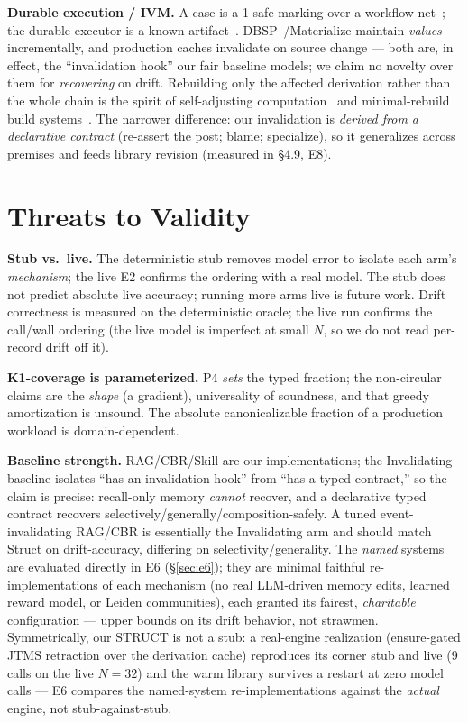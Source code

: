 \documentclass[11pt]{article}
\newcommand{\K}{\textsf{K1}}
\begin{document}
\textbf{Durable execution / IVM.} A case is a 1-safe marking over a workflow net~\cite{vanderaalst1998}; the durable
executor is a known artifact~\cite{aws2022,dbos2022}. DBSP~\cite{budiu2023}/Materialize maintain \emph{values}
incrementally, and production caches invalidate on source change --- both are, in effect, the ``invalidation hook''
our fair baseline models; we claim no novelty over them for \emph{recovering} on drift. Rebuilding only the affected
derivation rather than the whole chain is the spirit of self-adjusting computation~\cite{acar2002} and
minimal-rebuild build systems~\cite{mokhov2018}. The narrower difference: our
invalidation is \emph{derived from a declarative contract} (re-assert the post; blame; specialize), so it generalizes
across premises and feeds library revision (measured in \S4.9, E8).

\section{Threats to Validity}
\textbf{Stub vs.\ live.} The deterministic stub removes model error to isolate each arm's \emph{mechanism}; the live
E2 confirms the ordering with a real model. The stub does not predict absolute live accuracy; running more arms live
is future work. Drift correctness is measured on the deterministic oracle; the live run confirms the call/wall
ordering (the live model is imperfect at small $N$, so we do not read per-record drift off it).

\textbf{\K{}-coverage is parameterized.} P4 \emph{sets} the typed fraction; the non-circular claims are the
\emph{shape} (a gradient), universality of soundness, and that greedy amortization is unsound. The absolute
canonicalizable fraction of a production workload is domain-dependent.

\textbf{Baseline strength.} RAG/CBR/Skill are our implementations; the Invalidating baseline isolates ``has an
invalidation hook'' from ``has a typed contract,'' so the claim is precise: recall-only memory \emph{cannot}
recover, and a declarative typed contract recovers selectively/generally/composition-safely. A tuned
event-invalidating RAG/CBR is essentially the Invalidating arm and
should match Struct on drift-accuracy, differing on selectivity/generality. The \emph{named} systems are evaluated
directly in E6 (\S\ref{sec:e6}); they are minimal faithful re-implementations of each mechanism (no real LLM-driven
memory edits, learned reward model, or Leiden communities), each granted its fairest, \emph{charitable}
configuration --- upper bounds on its drift behavior, not strawmen. Symmetrically, our STRUCT is not a stub: a
real-engine realization (ensure-gated JTMS retraction over the derivation cache) reproduces its corner stub and
live (9 calls on the live $N=32$) and the warm library survives a restart at zero model calls --- E6 compares the
named-system re-implementations against the \emph{actual} engine, not stub-against-stub.
\end{document}
